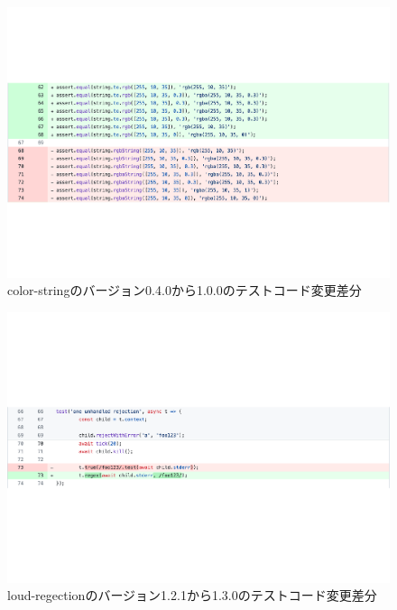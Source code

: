 \documentclass[11pt,dvipdfmx]{jreport}
\begin{document}
\begin{figure}[t]
  \centering
  \includegraphics[width=1.0\linewidth]{fig/rq1/rgb/rgb-test.pdf}
  \caption{color-stringのバージョン0.4.0から1.0.0のテストコード変更差分}
  \label{fig:rq1.change-test-input-test}
\end{figure}

\begin{figure}[t]
  \centering
  \includegraphics[width=1.0\linewidth]{fig/rq1/rejection/rejection-test.pdf}
  \caption{loud-regectionのバージョン1.2.1から1.3.0のテストコード変更差分}
  \label{fig:rq1.change-test-rejection-test}
\end{figure}
\end{document}
